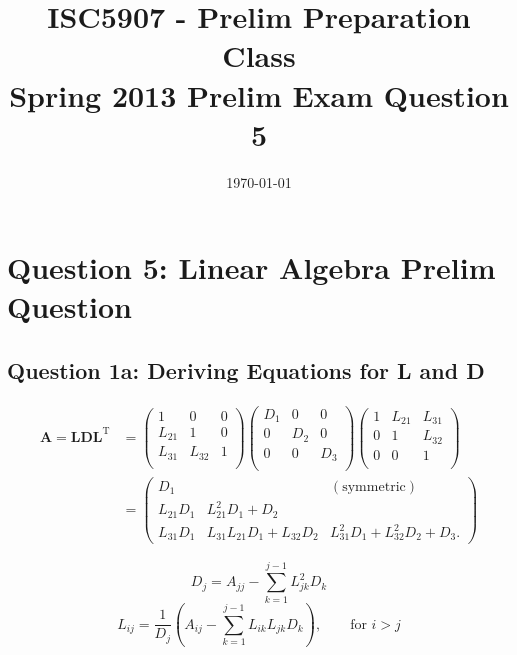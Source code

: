 \documentclass[11pt,a4paper,oneside]{article}
\begin{document}
\title{ISC5907 - Prelim Preparation Class \\ 
	 Spring 2013 Prelim Exam Question 5}
\date{\today}
\maketitle

\section{Question 5: Linear Algebra Prelim Question}
\subsection{Question 1a: Deriving Equations for L and D}
\begin{align}
{\mathbf{A=LDL}^\mathrm{T}} & =
\begin{pmatrix}   1 & 0 & 0 \\
   L_{21} & 1 & 0 \\
   L_{31} & L_{32} & 1\\
\end{pmatrix}
\begin{pmatrix}   D_1 & 0 & 0 \\
   0 & D_2 & 0 \\
   0 & 0 & D_3\\
\end{pmatrix}
\begin{pmatrix}   1 & L_{21} & L_{31} \\
   0 & 1 & L_{32} \\
   0 & 0 & 1\\
\end{pmatrix} \\
& = \begin{pmatrix}   D_1 &   &(\mathrm{symmetric})   \\
   L_{21}D_1 & L_{21}^2D_1 + D_2& \\
   L_{31}D_1 & L_{31}L_{21}D_{1}+L_{32}D_2 & L_{31}^2D_1 + L_{32}^2D_2+D_3.
\end{pmatrix}
\end{align}

\begin{equation}
D_j = A_{jj} - \sum_{k=1}^{j-1} L_{jk}^2 D_k
\end{equation}
\begin{equation}
L_{ij} = \frac{1}{D_j} \left( A_{ij} - \sum_{k=1}^{j-1} L_{ik} L_{jk} D_k \right), \qquad\text{for } i>j
\end{equation}
\end{document}
